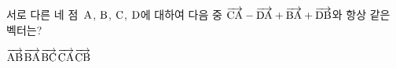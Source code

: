 서로 다른 네 점~$\mathrm{A}$, $\mathrm{B}$, $\mathrm{C}$, $\mathrm{D}$에 대하여 다음 중 $\overrightarrow{\mathrm{CA}}-\overrightarrow{\mathrm{DA}}+\overrightarrow{\mathrm{BA}}+\overrightarrow{\mathrm{DB}}$와 항상 같은 벡터는?
\begin{choices32}{$\overrightarrow{\mathrm{AB}}$}{$\overrightarrow{\mathrm{BA}}$}{$\overrightarrow{\mathrm{BC}}$}{$\overrightarrow{\mathrm{CA}}$}{$\overrightarrow{\mathrm{CB}}$}\end{choices32}
